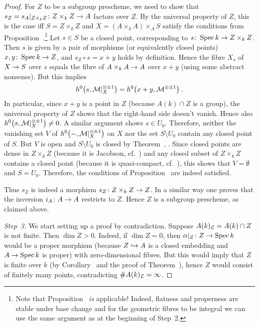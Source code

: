 \documentclass[a4paper,parskip=half,numbers=enddot, DIV=12]{scrreprt}
\begin{document}
\begin{proof}
	 For $Z$ to be a subgroup prescheme, we need to show that $s_Z=s_A|_{Z\times_kZ}\colon Z\times_kZ\morphism A$ factors over $Z$. By the universal property of $Z$, this is the case iff $S=Z\times_kZ$ and $X=(A\times_kA)\times_AS$ satisfy the conditions from Proposition~.\footnote{Note that Proposition~ \emph{is} applicable! Indeed, flatness and properness are stable under base change and for the geometric fibres to be integral we can use the same argument as at the beginning of Step~2.} Let $s\in S$ be a closed point, corresponding to $s\colon \Spec k\morphism Z\times_kZ$. Then $s$ is given by a pair of morphisms (or equivalently closed points) $x,y\colon \Spec k\morphism Z$, and $s_Z\circ s=x+y$ holds by definition. Hence the fibre $X_s$ of $X\morphism S$ over $s$ equals the fibre of $A\times_kA\morphism A$ over $x+y$ (using some abstract nonsense). But this implies
	 \begin{align*}
	 	h^0\big(s,\mathcal{M}|_X^{\otimes \pm1}\big)=h^0\big(x+y,\mathcal{M}^{\otimes \pm 1}\big)\;.
	 \end{align*}
	 In particular, since $x+y$ is a point in $Z$ (because $A(k)\cap Z$ is a group), the universal property of $Z$ shows that the right-hand side doesn't vanish. Hence also $h^0\big(s,\mathcal{M}|_X^{\otimes \pm1}\big)\neq 0$. A similar argument shows $s\in U_0$. Therefore, neither the vanishing set $V$ of $h^0\big(-,\mathcal{M}|_X^{\otimes \pm1}\big)$ on $X$ nor the set $S\setminus U_0$ contain any closed point of $S$. But $V$ is open and $S\setminus U_0$ is closed by Theorem~, . Since closed points are dense in $Z\times_kZ$ (because it is Jacobson, cf.\ \cite[Definition~2.4.2]{alggeo1}) and any closed subset of $Z\times_kZ$ contains a closed point (because it is quasi-compact, cf.\ \cite[Proposition~2.1.1]{alggeo1}), this shows that $V=\emptyset$ and $S=U_0$. Therefore, the conditions of Proposition~ are indeed satisfied.
	 
	 Thus $s_Z$ is indeed a morphism $s_Z\colon Z\times_kZ\morphism Z$. In a similar way one proves that the inversion $i_A\colon A\morphism A$ restricts to $Z$. Hence $Z$ is a subgroup prescheme, as claimed above.
	 
	 \emph{Step~3.} We start setting up a proof by contradiction. Suppose $A(k)_{\mathcal{L}}=A(k)\cap Z$ is not finite. Then $\dim Z>0$. Indeed, if $\dim Z=0$, then $\alpha|_Z\colon Z\morphism\Spec k$ would be a proper morphism (because $Z\monomorphism A$ is a closed embedding and $A\morphism\Spec k$ is proper) with zero-dimensional fibres. But this would imply that $Z$ is finite over $k$ (by Corollary~ and the proof of Theorem~), hence $Z$ would consist of finitely many points, contradicting $\# A(k)_{\mathcal{L}}=\infty$.
	 

\end{proof}
\end{document}
